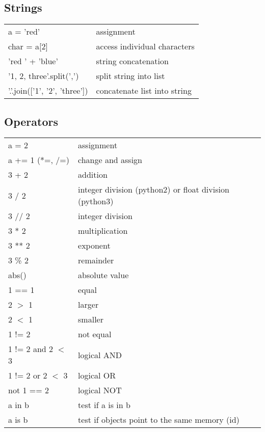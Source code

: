 \documentclass[10pt, a4paper, twocolumn]{article}
\begin{document}
\subsection*{Strings}
\begin{tabular}{ p{} p{} }
  a = 'red' & assignment\\
  char = a[2] & access individual characters\\
  'red ' + 'blue' & string concatenation\\
  '1, 2, three'.split(',') & split string into list\\
  '.'.join(['1', '2', 'three']) & concatenate list into string\\
\end{tabular}

\subsection*{Operators}
\begin{tabular}{ p{} p{} }
  a = 2 & assignment\\
  a += 1 (*=, /=) & change and assign\\
  3 + 2 & addition\\
  3 / 2 & integer division (python2) or float division (python3)\\
  3 // 2 & integer division\\
  3 * 2 & multiplication\\
  3 ** 2 & exponent\\
  3 \% 2 & remainder\\
  abs() & absolute value\\
  1 == 1 & equal\\
  2 $>$ 1 & larger\\
  2 $<$ 1 & smaller\\
  1 != 2 & not equal\\
  1 != 2 and 2 $<$ 3 & logical AND\\
  1 != 2 or 2 $<$ 3 & logical OR\\
  not 1 == 2 & logical NOT\\
  a in b & test if a is in b\\
  a is b & test if objects point to the same memory (id)\\[1pt]
\end{tabular}
\end{document}
